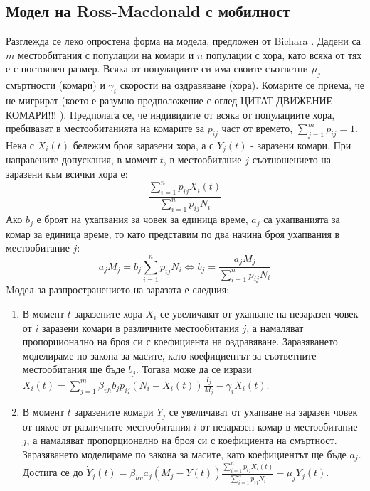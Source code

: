 \subsection{Модел на Ross-Macdonald с мобилност}
Разглежда се леко опростена форма на модела, предложен от Bichara \cite{Bichara2016}. Дадени са $m$ местообитания с популации на комари и $n$ популации с хора, като всяка от тях е с постоянен размер. Всяка от популациите си има своите съответни $\mu_j$ смъртности (комари) и $\gamma_i$ скорости на оздравяване (хора). Комарите се приема, че не мигрират (което е разумно предположение с оглед \color{Red} ЦИТАТ ДВИЖЕНИЕ КОМАРИ!!!
\color{Black}). Предполага се, че индивидите от всяка от популациите хора, пребивават в местообитанията на комарите за $p_{ij}$ част от времето, $\sum_{j=1}^m p_{ij} = 1$. \\
Нека с $X_i(t)$ бележим броя заразени хора, а с $Y_j(t)$ - заразени комари. При направените допускания, в момент $t$, в местообитание $j$ съотношението на заразени към всички хора е:
\begin{equation}
  \frac{\sum_{i=1}^n p_{ij} X_i(t)}{\sum_{i=1}^n p_{ij} N_i}
\end{equation}
Ако $b_j$ е броят на ухапвания за човек за единица време, $a_j$ са ухапванията за комар за единица време, то като представим по два начина броя ухапвания в местообитание $j$:
\begin{equation}
  a_j M_j = b_j \sum_{i=1}^n p_{ij} N_i \iff b_j = \frac{a_j M_j}{\sum_{i=1}^n p_{ij} N_i}
\end{equation}
Mодел за разпространението на заразата е следния:
\begin{enumerate}
  \item В момент $t$ заразените хора $X_i$ се увеличават от ухапване на незаразен човек от $i$ заразени комари в различните местообитания $j$, а намаляват пропорционално на броя си с коефициента на оздравяване. Заразяването моделираме по закона за масите, като коефициентът за съответните местообитания ще бъде $b_j$. Тогава може да се изрази $\dot{X}_i(t) = \sum_{j=1}^{m} \beta_{vh} b_j p_{ij} (N_i - X_i(t)) \frac{I_j}{M_j} - \gamma_i X_i(t)$.
  \item В момент $t$ заразените комари $Y_j$ се увеличават от ухапване на заразен човек от някое от различните местообитания $i$ от незаразен комар в местообитание $j$, а намаляват пропорционално на броя си с коефициента на смъртност. Заразяването моделираме по закона за масите, като коефициентът ще бъде $a_j$. Достига се до $\dot{Y}_j(t) = \beta_{hv} a_j (M_j - Y(t)) \frac{\sum_{i=1}^n p_{ij} X_i(t)}{\sum_{i=1}^n p_{ij} N_i} - \mu_j Y_j(t)$.
\end{enumerate}
